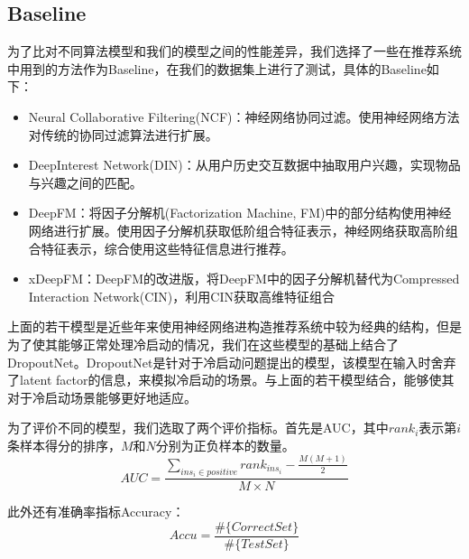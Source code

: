 \subsection{Baseline}
为了比对不同算法模型和我们的模型之间的性能差异，我们选择了一些在推荐系统中用到的方法作为Baseline，在我们的数据集上进行了测试，具体的Baseline如下：
\begin{itemize}
    \item Neural Collaborative Filtering(NCF)\cite{he2017neural}：神经网络协同过滤。使用神经网络方法对传统的协同过滤算法进行扩展。
    \item DeepInterest Network(DIN)\cite{zhou2018deep}：从用户历史交互数据中抽取用户兴趣，实现物品与兴趣之间的匹配。
    \item DeepFM\cite{guo2017deepfm}：将因子分解机(Factorization Machine, FM)中的部分结构使用神经网络进行扩展。使用因子分解机获取低阶组合特征表示，神经网络获取高阶组合特征表示，综合使用这些特征信息进行推荐。
    \item xDeepFM\cite{lian2018xdeepfm}：DeepFM的改进版，将DeepFM中的因子分解机替代为Compressed Interaction Network(CIN)，利用CIN获取高维特征组合
\end{itemize}
上面的若干模型是近些年来使用神经网络进构造推荐系统中较为经典的结构，但是为了使其能够正常处理冷启动的情况，我们在这些模型的基础上结合了DropoutNet\cite{volkovs2017dropoutnet}。DropoutNet是针对于冷启动问题提出的模型，该模型在输入时舍弃了latent factor的信息，来模拟冷启动的场景。与上面的若干模型结合，能够使其对于冷启动场景能够更好地适应。

为了评价不同的模型，我们选取了两个评价指标。首先是AUC，其中$rank_{i}$表示第$i$条样本得分的排序，$M$和$N$分别为正负样本的数量。
\begin{equation}
    AUC = \frac{\sum_{ins_i \in positive} rank_{ins_i} - \frac{M(M+1)}{2}}{M \times N}
\end{equation}

此外还有准确率指标Accuracy：
\begin{equation}
    Accu = \frac{\#\{CorrectSet\}}{\#\{TestSet\}}
\end{equation}